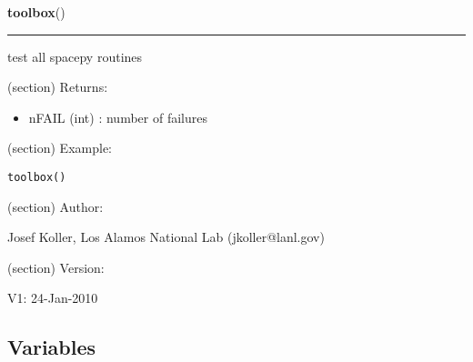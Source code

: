 \hspace{.8\funcindent}\begin{boxedminipage}{\funcwidth}

    \raggedright \textbf{toolbox}()

    \vspace{-1.5ex}

    \rule{\textwidth}{0.5\fboxrule}
\setlength{\parskip}{2ex}
    test all spacepy routines

    (section) Returns:

      \begin{itemize}
      \setlength{\parskip}{0.6ex}
        \item nFAIL (int) : number of failures

      \end{itemize}

    (section) Example:

\begin{alltt}
\pysrcprompt{{\textgreater}{\textgreater}{\textgreater} }toolbox()
\end{alltt}
    (section) Author:

      Josef Koller, Los Alamos National Lab (jkoller@lanl.gov)

    (section) Version:

      V1: 24-Jan-2010

\setlength{\parskip}{1ex}
    \end{boxedminipage}



  \subsection{Variables}

